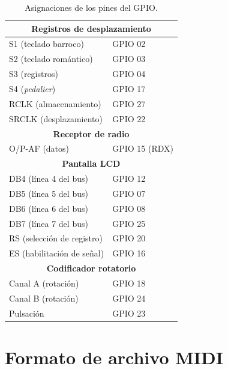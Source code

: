 \smallskip
\begin{table}[H]
	\begin{center}
		\begin{tabular}{|l|l|}
			\hline \multicolumn{2}{|c|}{\textbf{Registros de desplazamiento}} \\
			\hline S1 (teclado barroco) & \acrshort{GPIO} 02 \\ 
			\hline S2 (teclado romántico) & \acrshort{GPIO} 03 \\ 
			\hline S3 (registros) & \acrshort{GPIO} 04 \\ 
			\hline S4 (\textit{pedalier}) & \acrshort{GPIO} 17 \\ 
			\hline RCLK (almacenamiento) & \acrshort{GPIO} 27 \\ 
			\hline SRCLK (desplazamiento) & \acrshort{GPIO} 22 \\ 
			\hline \multicolumn{2}{|c|}{\textbf{Receptor de radio}} \\
			\hline O/P-AF (datos) & \acrshort{GPIO} 15 (RDX) \\ 
			\hline \multicolumn{2}{|c|}{\textbf{Pantalla \acrshort{LCD}}} \\
			\hline DB4 (línea 4 del bus) & \acrshort{GPIO} 12 \\ 
			\hline DB5 (línea 5 del bus) & \acrshort{GPIO} 07 \\ 
			\hline DB6 (línea 6 del bus) & \acrshort{GPIO} 08 \\ 
			\hline DB7 (línea 7 del bus) & \acrshort{GPIO} 25 \\
			\hline RS (selección de registro) & \acrshort{GPIO} 20 \\ 
			\hline ES (habilitación de señal) & \acrshort{GPIO} 16 \\ 
			\hline \multicolumn{2}{|c|}{\textbf{Codificador rotatorio}} \\
			\hline Canal A (rotación) & \acrshort{GPIO} 18 \\ 
			\hline Canal B (rotación) & \acrshort{GPIO} 24 \\ 
			\hline Pulsación & \acrshort{GPIO} 23 \\ 
			\hline 
		\end{tabular}
		\smallskip
		\caption{\label{tab:gpio} Asignaciones de los pines del GPIO.}
	\end{center}
\end{table}

\smallskip

\newpage

\section{Formato de archivo MIDI}
\label{sec:fmto_midi}

